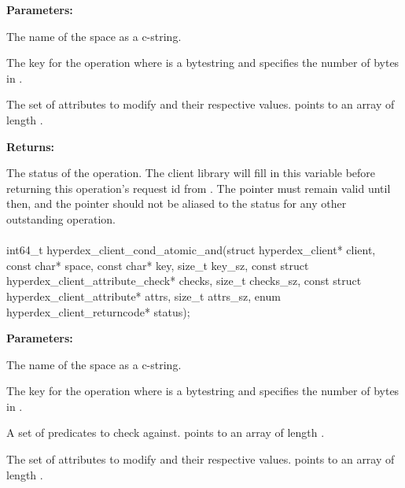 \noindent\textbf{Parameters:}
\begin{description}[labelindent=\widthof{{\code{attrs}, \code{attrs\_sz}}},leftmargin=*,noitemsep,nolistsep,align=right]
\item[\code{space}] The name of the space as a c-string.
\item[\code{key}, \code{key\_sz}] The key for the operation where  is a bytestring and  specifies the number of bytes in .
\item[\code{attrs}, \code{attrs\_sz}] The set of attributes to modify and their respective values.   points to an array of length .
\end{description}

\noindent\textbf{Returns:}
\begin{description}[labelindent=\widthof{{\code{status}}},leftmargin=*,noitemsep,nolistsep,align=right]
\item[\code{status}] The status of the operation.  The client library will fill in this variable before returning this operation's request id from .  The pointer must remain valid until then, and the pointer should not be aliased to the status for any other outstanding operation.
\end{description}

\paragraph{}
\label{api:c:cond_atomic_and}
\begin{ccode}
int64_t hyperdex_client_cond_atomic_and(struct hyperdex_client* client,
                const char* space,
                const char* key, size_t key_sz,
                const struct hyperdex_client_attribute_check* checks, size_t checks_sz,
                const struct hyperdex_client_attribute* attrs, size_t attrs_sz,
                enum hyperdex_client_returncode* status);
\end{ccode}
\funcdesc 

\noindent\textbf{Parameters:}
\begin{description}[labelindent=\widthof{{\code{checks}, \code{checks\_sz}}},leftmargin=*,noitemsep,nolistsep,align=right]
\item[\code{space}] The name of the space as a c-string.
\item[\code{key}, \code{key\_sz}] The key for the operation where  is a bytestring and  specifies the number of bytes in .
\item[\code{checks}, \code{checks\_sz}] A set of predicates to check against.   points to an array of length .
\item[\code{attrs}, \code{attrs\_sz}] The set of attributes to modify and their respective values.   points to an array of length .
\end{description}

